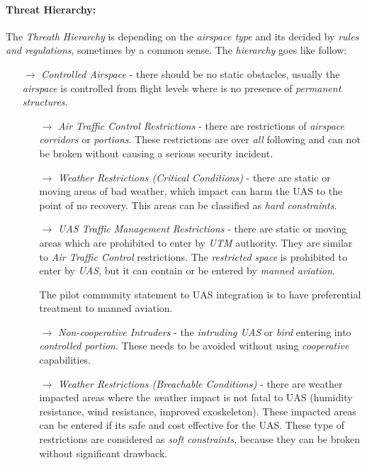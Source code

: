 \paragraph{Threat Hierarchy:} The \emph{Threath Hierarchy} is depending on the \emph{airspace type} and its decided by \emph{rules and regulations}, sometimes by a common sense. The \emph{hierarchy} goes like follow:

\begin{itemize}
    \item[$\to$] \emph{Controlled Airspace} - there should be no static obstacles, usually the \emph{airspace} is controlled from flight levels where is no presence of \emph{permanent structures}.
        \begin{itemize}
            \item[$\to$] \emph{Air Traffic Control Restrictions} - there are restrictions of \emph{airspace corridors} or \emph{portions}. These restrictions are over \emph{all} following and can not be broken without causing a serious security incident.
            
            \item[$\to$] \emph{Weather Restrictions (Critical Conditions)} - there are static or moving areas of bad weather, which impact can harm the UAS to the point of no recovery. This areas can be classified as \emph{hard constraints}.  
            
            \item[$\to$] \emph{UAS Traffic Management Restrictions} - there are static or moving  areas which are prohibited to enter by \emph{UTM} authority.  They are similar to \emph{Air Traffic Control} restrictions. The \emph{restricted space} is prohibited to enter by \emph{UAS}, but it can contain or be entered by \emph{manned aviation}.
            \begin{note}
                The pilot community statement to UAS integration is to have preferential treatment to manned aviation.
            \end{note}      
            
            
            \item[$\to$] \emph{Non-cooperative Intruders} - the \emph{intruding UAS} or \emph{bird} entering into \emph{controlled portion}. These needs to be avoided without using \emph{cooperative} capabilities.
            
            \item[$\to$] \emph{Weather Restrictions (Breachable Conditions)} - there are weather impacted areas where the \emph weather impact is not fatal to UAS (humidity resistance, wind resistance, improved exoskeleton). These impacted areas can be entered if its safe and cost effective for the UAS. These type of restrictions are considered as \emph{soft constraints}, because they can be broken without significant drawback. 
        \end{itemize}
        

\end{itemize}
